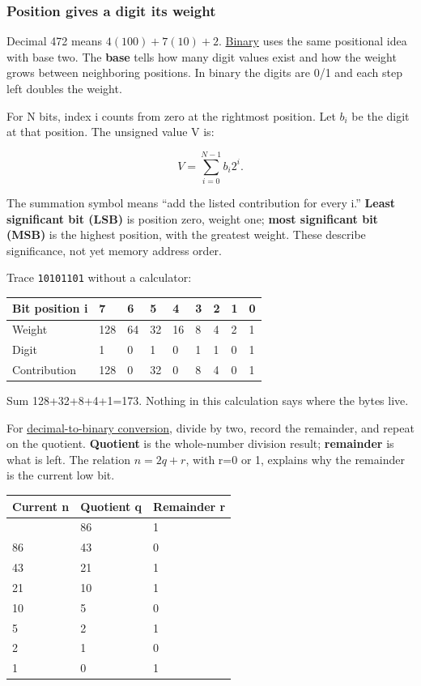\subsubsection{Position gives a digit its weight}\label{05-engine-i-ch001-position-gives-a-digit-its-weight}

Decimal 472 means \(4(100)+7(10)+2\). \hyperref[appendix-83c3f28f7bda]{Binary} uses the same positional idea with base two. The \textbf{base} tells how many digit values exist and how the weight grows between neighboring positions. In binary the digits are 0/1 and each step left doubles the weight.

For N bits, index i counts from zero at the rightmost position. Let \(b_i\) be the digit at that position. The unsigned value V is:

\[
V=\sum_{i=0}^{N-1}b_i2^i.
\]

The summation symbol means ``add the listed contribution for every i.'' \textbf{Least significant bit (LSB)} is position zero, weight one; \textbf{most significant bit (MSB)} is the highest position, with the greatest weight. These describe significance, not yet memory address order.

Trace \texttt{10101101} without a calculator:

{\def\LTcaptype{none} %
\begin{longtable}[]{@{}lllllllll@{}}
\toprule\noalign{}
Bit position i & 7 & 6 & 5 & 4 & 3 & 2 & 1 & 0 \\
\midrule\noalign{}
\endhead
\bottomrule\noalign{}
\endlastfoot
Weight & 128 & 64 & 32 & 16 & 8 & 4 & 2 & 1 \\
Digit & 1 & 0 & 1 & 0 & 1 & 1 & 0 & 1 \\
Contribution & 128 & 0 & 32 & 0 & 8 & 4 & 0 & 1 \\
\end{longtable}
}

Sum 128+32+8+4+1=173. Nothing in this calculation says where the bytes live.

For \hyperref[appendix-dc552784a2c0]{decimal-to-binary conversion}, divide by two, record the remainder, and repeat on the quotient. \textbf{Quotient} is the whole-number division result; \textbf{remainder} is what is left. The relation \(n=2q+r\), with r=0 or 1, explains why the remainder is the current low bit.

{\def\LTcaptype{none} %
\begin{longtable}[]{@{}lll@{}}
\toprule\noalign{}
Current n & Quotient q & Remainder r \\
\midrule\noalign{}
\endhead
\bottomrule\noalign{}
\endlastfoot
173 & 86 & 1 \\
86 & 43 & 0 \\
43 & 21 & 1 \\
21 & 10 & 1 \\
10 & 5 & 0 \\
5 & 2 & 1 \\
2 & 1 & 0 \\
1 & 0 & 1 \\
\end{longtable}
}


